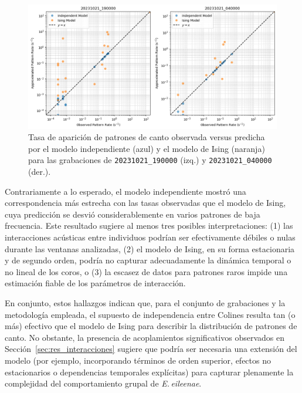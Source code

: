 \begin{figure}[ht]
    \centering
    \includegraphics[width=\columnwidth]{Graphics/isingvsindependent.png}
    \caption{Tasa de aparición de patrones de canto observada versus predicha por el modelo independiente (azul) y el modelo de Ising (naranja) para las grabaciones de \texttt{20231021\_190000} (izq.) y \texttt{20231021\_040000} (der.).}
    \label{fig:ising_vs_indep}
\end{figure}

Contrariamente a lo esperado, el modelo independiente mostró una 
correspondencia más estrecha con las tasas observadas que el 
modelo de Ising, cuya predicción se desvió considerablemente en 
varios patrones de baja frecuencia. Este resultado sugiere al 
menos tres posibles interpretaciones: (1) las interacciones 
acústicas entre individuos podrían ser efectivamente débiles o 
nulas durante las ventanas analizadas, (2) el modelo de Ising, 
en su forma estacionaria y de segundo orden, podría no capturar 
adecuadamente la dinámica temporal o no lineal de los coros, o 
(3) la escasez de datos para patrones raros impide una estimación 
fiable de los parámetros de interacción.

En conjunto, estos hallazgos indican que, para el conjunto de 
grabaciones y la metodología empleada, el supuesto de 
independencia entre Colines resulta tan (o más) efectivo que el 
modelo de Ising para describir la distribución de patrones de 
canto. No obstante, la presencia de acoplamientos significativos 
observados en Sección~\ref{sec:res_interacciones} sugiere que 
podría ser necesaria una extensión del modelo (por ejemplo, 
incorporando términos de orden superior, efectos no 
estacionarios o dependencias temporales explícitas) para 
capturar plenamente la complejidad del comportamiento grupal de 
\emph{E.\,eileenae}.
